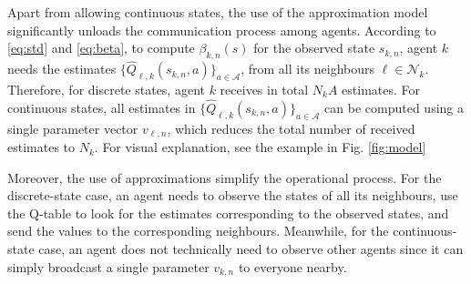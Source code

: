 \documentclass[lettersize,journal]{IEEEtran}
\begin{document}
Apart from allowing continuous states, the use of the approximation model significantly unloads the communication process among agents. According to \eqref{eq:std} and \eqref{eq:beta}, to compute $\beta_{k,n}(s)$ for the observed state $s_{k,n}$, agent $k$  needs the estimates $\{\widehat{Q}_{\ell,k}(s_{k,n},a)\}_{a\in\mathcal{A}}$, from all its neighbours $\ell \in \mathcal{N}_{k}$. Therefore, for discrete states, agent $k$ receives in total $N_kA$ estimates. For continuous states, all estimates in $\{\widehat{Q}_{\ell,k}(s_{k,n},a)\}_{a\in\mathcal{A}}$ can be computed using a single parameter vector $v_{\ell,n}$, which reduces the total number of received estimates to $N_{k}$. For visual explanation, see the example in Fig. \ref{fig:model}\par 
Moreover, the use of approximations simplify the operational process. For the discrete-state case, an agent needs to observe the states of all its neighbours, use the Q-table to look for the estimates corresponding to the observed states, and send the values to the corresponding neighbours. Meanwhile, for the continuous-state case, an agent does not technically need to observe other agents since it can simply broadcast a single parameter $v_{k,n}$ to everyone nearby.





\end{document}
